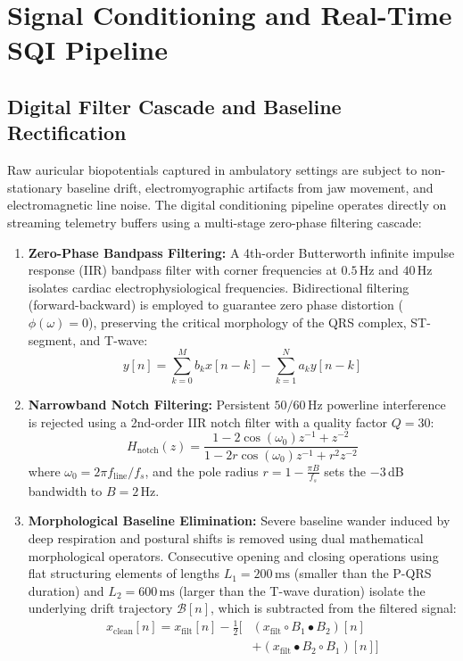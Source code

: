 \section{Signal Conditioning and Real-Time SQI Pipeline}
\label{sec:conditioning}

\subsection{Digital Filter Cascade and Baseline Rectification}
Raw auricular biopotentials captured in ambulatory settings are subject to non-stationary baseline drift, electromyographic artifacts from jaw movement, and electromagnetic line noise. The digital conditioning pipeline operates directly on streaming telemetry buffers using a multi-stage zero-phase filtering cascade:
\begin{enumerate}
    \item \textbf{Zero-Phase Bandpass Filtering:} A 4th-order Butterworth infinite impulse response (IIR) bandpass filter with corner frequencies at $0.5$\,Hz and $40$\,Hz isolates cardiac electrophysiological frequencies. Bidirectional filtering (forward-backward) is employed to guarantee zero phase distortion ($\phi(\omega) = 0$), preserving the critical morphology of the QRS complex, ST-segment, and T-wave:
    \begin{equation}
        y[n] = \sum_{k=0}^{M} b_k x[n-k] - \sum_{k=1}^{N} a_k y[n-k]
    \end{equation}
    \item \textbf{Narrowband Notch Filtering:} Persistent $50/60$\,Hz powerline interference is rejected using a 2nd-order IIR notch filter with a quality factor $Q = 30$:
    \begin{equation}
        H_{\text{notch}}(z) = \frac{1 - 2\cos(\omega_0)z^{-1} + z^{-2}}{1 - 2r\cos(\omega_0)z^{-1} + r^2 z^{-2}}
    \end{equation}
    where $\omega_0 = 2\pi f_{\text{line}} / f_s$, and the pole radius $r = 1 - \frac{\pi B}{f_s}$ sets the $-3$\,dB bandwidth to $B = 2$\,Hz.
    \item \textbf{Morphological Baseline Elimination:} Severe baseline wander induced by deep respiration and postural shifts is removed using dual mathematical morphological operators. Consecutive opening and closing operations using flat structuring elements of lengths $L_1 = 200\,\text{ms}$ (smaller than the P-QRS duration) and $L_2 = 600\,\text{ms}$ (larger than the T-wave duration) isolate the underlying drift trajectory $\mathcal{B}[n]$, which is subtracted from the filtered signal:
    \begin{align}
        x_{\text{clean}}[n] = x_{\text{filt}}[n] - \frac{1}{2} [ & (x_{\text{filt}} \circ B_1 \bullet B_2)[n] \nonumber \\
        & + (x_{\text{filt}} \bullet B_2 \circ B_1)[n] ]
    \end{align}
\end{enumerate}

